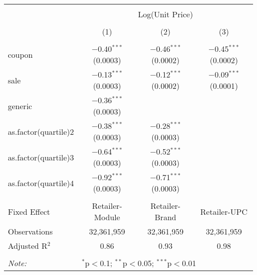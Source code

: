 
\begin{table}[!htbp] \centering 
  \caption{} 
  \label{tab:overallSavingsStorable} 
\begin{tabular}{@{\extracolsep{5pt}}lccc} 
\\[-1.8ex]\hline 
\hline \\[-1.8ex] 
 & \multicolumn{3}{c}{Log(Unit Price)} \\ 
\\[-1.8ex] & (1) & (2) & (3)\\ 
\hline \\[-1.8ex] 
 coupon & $-$0.40$^{***}$ (0.0003) & $-$0.46$^{***}$ (0.0002) & $-$0.45$^{***}$ (0.0002) \\ 
  sale & $-$0.13$^{***}$ (0.0003) & $-$0.12$^{***}$ (0.0002) & $-$0.09$^{***}$ (0.0001) \\ 
  generic & $-$0.36$^{***}$ (0.0003) &  &  \\ 
  as.factor(quartile)2 & $-$0.38$^{***}$ (0.0003) & $-$0.28$^{***}$ (0.0003) &  \\ 
  as.factor(quartile)3 & $-$0.64$^{***}$ (0.0003) & $-$0.52$^{***}$ (0.0003) &  \\ 
  as.factor(quartile)4 & $-$0.92$^{***}$ (0.0003) & $-$0.71$^{***}$ (0.0003) &  \\ 
 \hline \\[-1.8ex] 
Fixed Effect & Retailer-Module & Retailer-Brand & Retailer-UPC \\ 
Observations & 32,361,959 & 32,361,959 & 32,361,959 \\ 
Adjusted R$^{2}$ & 0.86 & 0.93 & 0.98 \\ 
\hline 
\hline \\[-1.8ex] 
\textit{Note:}  & \multicolumn{3}{l}{$^{*}$p$<$0.1; $^{**}$p$<$0.05; $^{***}$p$<$0.01} \\ 
\end{tabular} 
\end{table} 
